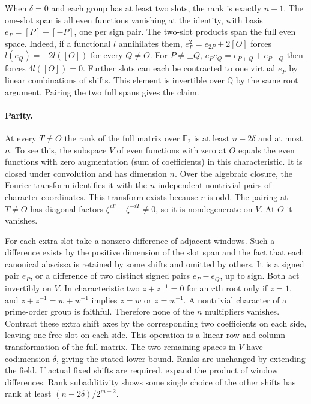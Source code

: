 \documentclass[11pt]{article}
\begin{document}
When $\delta=0$ and each group has at least two slots, the rank is
exactly $n+1$. The one-slot span is all even functions vanishing at
the identity, with basis $e_P=[P]+[-P]$, one per sign pair. The
two-slot products span the full even space. Indeed, if a functional
$l$ annihilates them, $e_P^2=e_{2P}+2[O]$ forces
$l(e_Q)=-2l([O])$ for every $Q\ne O$. For $P\ne\pm Q$,
$e_Pe_Q=e_{P+Q}+e_{P-Q}$ then forces $4l([O])=0$. Further slots
can each be contracted to one virtual $e_P$ by linear combinations
of shifts. This element is invertible over $\mathbb Q$ by the same
root argument. Pairing the two full spans gives the claim.

\paragraph{Parity.}
At every $T\ne O$ the rank of the full matrix over $\mathbb F_2$
is at least $n-2\delta$ and at most $n$. To see this, the subspace
$V$ of even functions with zero at $O$ equals the even functions
with zero augmentation (sum of coefficients) in this characteristic.
It is closed under convolution and has dimension $n$. Over the
algebraic closure, the Fourier transform identifies it with the
$n$ independent nontrivial pairs of character coordinates. This
transform exists because $r$ is odd. The pairing at $T\ne O$ has
diagonal factors $\zeta^{iT}+\zeta^{-iT}\ne0$, so it is
nondegenerate on $V$. At $O$ it vanishes.

For each extra slot take a nonzero difference of adjacent windows.
Such a difference exists by the positive dimension of the slot span
and the fact that each canonical abscissa is retained by some shifts
and omitted by others. It is a signed pair $e_P$, or a difference
of two distinct signed pairs $e_P-e_Q$, up to sign. Both act
invertibly on $V$. In characteristic two $z+z^{-1}=0$ for an
$r$th root only if $z=1$, and $z+z^{-1}=w+w^{-1}$ implies
$z=w$ or $z=w^{-1}$. A nontrivial character of a prime-order group
is faithful. Therefore none of the $n$ multipliers vanishes.
Contract these extra shift axes by the corresponding two coefficients
on each side, leaving one free slot on each side. This operation
is a linear row and column transformation of the full matrix.
The two remaining spaces in $V$ have codimension $\delta$, giving
the stated lower bound. Ranks are unchanged by extending the field.
If actual fixed shifts are required, expand the product of window
differences. Rank subadditivity shows some single choice of the
other shifts has rank at least $(n-2\delta)/2^{m-2}$.
\end{document}
